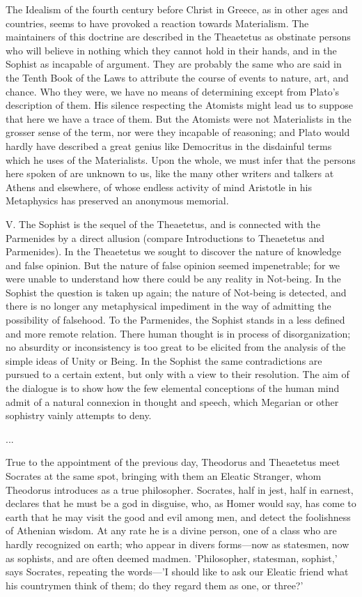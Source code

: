 \documentclass[11pt,letter]{article}
\begin{document}
\par  The Idealism of the fourth century before Christ in Greece, as in other ages and countries, seems to have provoked a reaction towards Materialism. The maintainers of this doctrine are described in the Theaetetus as obstinate persons who will believe in nothing which they cannot hold in their hands, and in the Sophist as incapable of argument. They are probably the same who are said in the Tenth Book of the Laws to attribute the course of events to nature, art, and chance. Who they were, we have no means of determining except from Plato's description of them. His silence respecting the Atomists might lead us to suppose that here we have a trace of them. But the Atomists were not Materialists in the grosser sense of the term, nor were they incapable of reasoning; and Plato would hardly have described a great genius like Democritus in the disdainful terms which he uses of the Materialists. Upon the whole, we must infer that the persons here spoken of are unknown to us, like the many other writers and talkers at Athens and elsewhere, of whose endless activity of mind Aristotle in his Metaphysics has preserved an anonymous memorial.

\par  V. The Sophist is the sequel of the Theaetetus, and is connected with the Parmenides by a direct allusion (compare Introductions to Theaetetus and Parmenides). In the Theaetetus we sought to discover the nature of knowledge and false opinion. But the nature of false opinion seemed impenetrable; for we were unable to understand how there could be any reality in Not-being. In the Sophist the question is taken up again; the nature of Not-being is detected, and there is no longer any metaphysical impediment in the way of admitting the possibility of falsehood. To the Parmenides, the Sophist stands in a less defined and more remote relation. There human thought is in process of disorganization; no absurdity or inconsistency is too great to be elicited from the analysis of the simple ideas of Unity or Being. In the Sophist the same contradictions are pursued to a certain extent, but only with a view to their resolution. The aim of the dialogue is to show how the few elemental conceptions of the human mind admit of a natural connexion in thought and speech, which Megarian or other sophistry vainly attempts to deny.

\par  ...

\par  True to the appointment of the previous day, Theodorus and Theaetetus meet Socrates at the same spot, bringing with them an Eleatic Stranger, whom Theodorus introduces as a true philosopher. Socrates, half in jest, half in earnest, declares that he must be a god in disguise, who, as Homer would say, has come to earth that he may visit the good and evil among men, and detect the foolishness of Athenian wisdom. At any rate he is a divine person, one of a class who are hardly recognized on earth; who appear in divers forms—now as statesmen, now as sophists, and are often deemed madmen. 'Philosopher, statesman, sophist,' says Socrates, repeating the words—'I should like to ask our Eleatic friend what his countrymen think of them; do they regard them as one, or three?'
\end{document}
